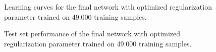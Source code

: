 \documentclass{article}
\begin{document}
\begin{figure}[H]
  \centering
    
  \caption{Learning curves for the final network with optimized
           regularization parameter trained on 49.000 training samples.}
  \label{fig:curves_final_three_cycles}
\end{figure}

\begin{figure}[H]
  \centering
    
  \caption{Test set performance of the final network with optimized
           regularization parameter trained on 49.000 training samples.}
  \label{fig:performance_final_three_cycles}
\end{figure}
\end{document}
